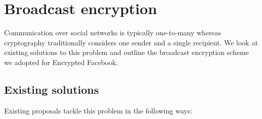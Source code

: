 





\FloatBarrier
\section{Broadcast encryption}

Communication over social networks is typically one-to-many whereas cryptography traditionally considers one sender and a single recipient. We look at existing solutions to this problem and outline the broadcast encryption scheme we adopted for Encrypted Facebook.


\FloatBarrier
\subsection{Existing solutions}

Existing proposals tackle this problem in the following ways:

